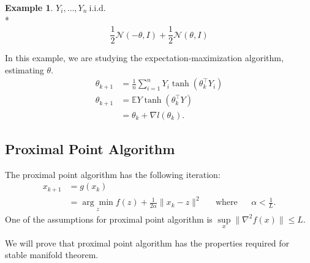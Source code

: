 \documentclass[twoside]{article}
\theoremstyle{definition}
\theoremstyle{definition}
\newtheorem{exmp}{Example}
\theoremstyle{remark}
\begin{document}
\begin{exmp}
$Y_i, \ldots, Y_n \ \text{i.i.d.}$ \\*
$$\frac{1}{2} \mathcal{N}(-\theta, I) + \frac{1}{2} \mathcal{N}(\theta, I)$$

In this example, we are studying the expectation-maximization algorithm, estimating $\theta$.
\[
\begin{aligned}
\theta_{k+1} &= \frac{1}{n} \sum \limits_{i=1}^n Y_i \tanh (\theta_k^\top Y_i) \\
\theta_{k+1} &= \mathbb{E} Y \tanh (\theta_k^\top Y) \\
&= \theta_k + \nabla l(\theta_k).
\end{aligned}
\]

\end{exmp}

\subsection{Proximal Point Algorithm}

The proximal point algorithm has the following iteration:
\[
\begin{aligned}
x_{k+1} &= g(x_k) \\
&= \underset{z}{\arg\min} f(z) + \frac{1}{2 \alpha} \| x_k - z \|^2 && \text{where} && \alpha < \frac{1}{L}.
\end{aligned}
\]
One of the assumptions for proximal point algorithm is $\sup \limits_x \| \nabla^2 f(x) \| \leq L$.

We will prove that proximal point algorithm has the properties required for stable manifold theorem.
\end{document}
